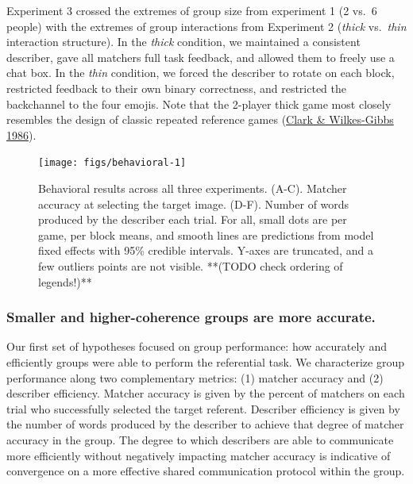 \documentclass[
  english,
]{article}
\begin{document}
Experiment 3 crossed the extremes of group size from experiment 1 (2 vs.~6 people) with the extremes of group interactions from Experiment 2 (\emph{thick} vs.~\emph{thin} interaction structure).
In the \emph{thick} condition, we maintained a consistent describer, gave all matchers full task feedback, and allowed them to freely use a chat box.
In the \emph{thin} condition, we forced the describer to rotate on each block, restricted feedback to their own binary correctness, and restricted the backchannel to the four emojis.
Note that the 2-player thick game most closely resembles the design of classic repeated reference games (\protect\hyperlink{ref-clark1986}{Clark \& Wilkes-Gibbs 1986}).

\begin{figure}[t!]

{\centering \texttt{[image: figs/behavioral-1]} 

}

\caption{Behavioral results across all three experiments. (A-C). Matcher accuracy at selecting the target image. (D-F). Number of words produced by the describer each trial. For all, small dots are per game, per block means, and smooth lines are predictions from model fixed effects with 95\% credible intervals. Y-axes are truncated, and a few outliers points are not visible. **(TODO check ordering of legends!)**}\label{fig:behavioral}
\end{figure}

\hypertarget{smaller-and-higher-coherence-groups-are-more-accurate.}{%
\subsubsection{Smaller and higher-coherence groups are more accurate.}\label{smaller-and-higher-coherence-groups-are-more-accurate.}}

Our first set of hypotheses focused on group performance: how accurately and efficiently groups were able to perform the referential task.
We characterize group performance along two complementary metrics: (1) matcher accuracy and (2) describer efficiency.
Matcher accuracy is given by the percent of matchers on each trial who successfully selected the target referent.
Describer efficiency is given by the number of words produced by the describer to achieve that degree of matcher accuracy in the group.
The degree to which describers are able to communicate more efficiently without negatively impacting matcher accuracy is indicative of convergence on a more effective shared communication protocol within the group.
\end{document}
